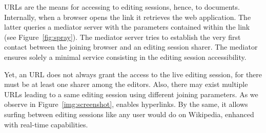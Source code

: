 URLs are the means for accessing to editing sessions, hence, to
documents. Internally, when a browser opens the link it retrieves the web
application. The latter queries a mediator server with the parameters contained
within the link (see Figure~\ref{fig:spray}). The mediator server tries to
establish the very first contact between the joining browser and an editing
session sharer.  The mediator ensures solely a minimal service consisting in the
editing session accessibility.

Yet, an URL does not always grant the access to the live editing session, for
there must be at least one sharer among the editors. Also, there may exist
multiple URLs leading to a same editing session using different joining
parameters. As we observe in Figure~\ref{img:screenshot}, \CRATE enables
hyperlinks. By the same, it allows surfing between editing sessions like any
user would do on Wikipedia, enhanced with real-time capabilities.

